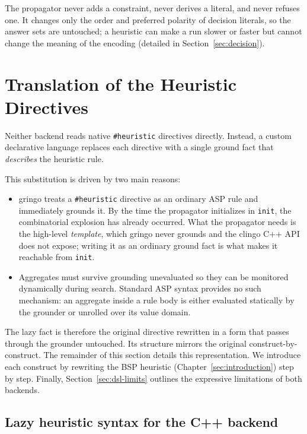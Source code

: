 The propagator never adds a constraint, never derives a literal, and never refuses one. It changes only the order and preferred polarity of decision literals, so the answer sets are untouched; a heuristic can make a run slower or faster but cannot change the meaning of the encoding (detailed in Section~\ref{sec:decision}).

\section{Translation of the Heuristic Directives}
\label{sec:dsl}

Neither backend reads native \texttt{\#heuristic} directives directly. Instead, a custom declarative language replaces each directive with a single ground fact that \emph{describes} the heuristic rule.

This substitution is driven by two main reasons:
\begin{itemize}[leftmargin=1.5em, itemsep=2pt]
    \item gringo treats a \texttt{\#heuristic} directive as an ordinary ASP rule and immediately grounds it. By the time the propagator initializes in \texttt{init}, the combinatorial explosion has already occurred. What the propagator needs is the high-level \emph{template}, which gringo never grounds and the clingo C++ API does not expose; writing it as an ordinary ground fact is what makes it reachable from \texttt{init}.
    \item Aggregates must survive grounding unevaluated so they can be monitored dynamically during search. Standard ASP syntax provides no such mechanism: an aggregate inside a rule body is either evaluated statically by the grounder or unrolled over its value domain.
\end{itemize}

The lazy fact is therefore the original directive rewritten in a form that passes through the grounder untouched. Its structure mirrors the original construct-by-construct. 
The remainder of this section details this representation. We introduce each construct by rewriting the BSP heuristic (Chapter~\ref{sec:introduction}) step by step. Finally, Section~\ref{sec:dsl-limits} outlines the expressive limitations of both backends.

\subsection{Lazy heuristic syntax for the C++ backend}

